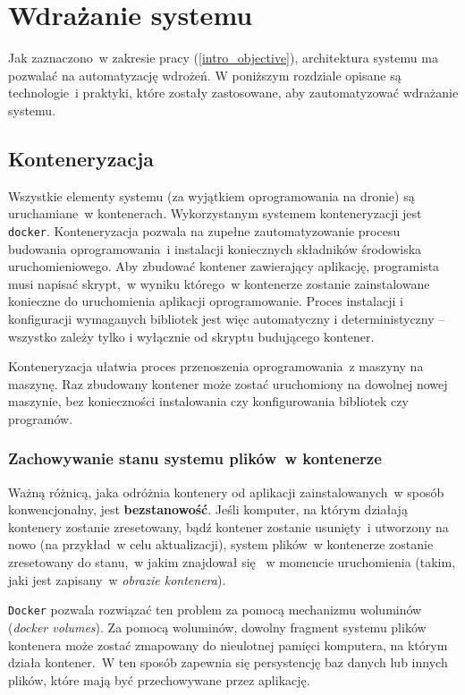 \chapter{Wdrażanie systemu} \label{chapter_deployment}

Jak zaznaczono~w zakresie pracy (\ref{intro_objective}),
architektura systemu ma pozwalać na automatyzację wdrożeń.
W poniższym rozdziale opisane są technologie~i praktyki, które zostały 
zastosowane, aby zautomatyzować wdrażanie systemu.

\section{Konteneryzacja}

Wszystkie elementy systemu (za wyjątkiem oprogramowania na dronie) są uruchamiane~w kontenerach.
Wykorzystanym systemem konteneryzacji jest \texttt{docker}\cite{docker}.
Konteneryzacja pozwala na zupełne zautomatyzowanie
procesu budowania oprogramowania~i instalacji koniecznych
składników środowiska uruchomieniowego. Aby zbudować kontener zawierający
aplikację, programista musi napisać skrypt,~w wyniku
którego~w kontenerze zostanie zainstalowane konieczne 
do uruchomienia aplikacji oprogramowanie. Proces instalacji i konfiguracji
wymaganych bibliotek jest więc automatyczny i deterministyczny -- wszystko
zależy tylko i wyłącznie od skryptu budującego kontener.

Konteneryzacja ułatwia proces przenoszenia oprogramowania~z maszyny na maszynę. Raz zbudowany
kontener może zostać uruchomiony na dowolnej nowej maszynie, bez konieczności instalowania 
czy konfigurowania bibliotek czy programów. 

\subsection{Zachowywanie stanu systemu plików~w kontenerze} \label{volumes}

Ważną różnicą, jaka odróżnia kontenery od aplikacji zainstalowanych~w sposób konwencjonalny, jest \textbf{bezstanowość}. Jeśli komputer,
na którym działają kontenery zostanie zresetowany, bądź kontener zostanie
usunięty~i utworzony na nowo (na przykład~w celu aktualizacji), system
plików~w kontenerze zostanie zresetowany do stanu,~w jakim znajdował się ~w momencie uruchomienia (takim, jaki jest zapisany~w \textit{obrazie kontenera}).

\texttt{Docker} pozwala rozwiązać ten problem za pomocą mechanizmu 
woluminów (\textit{docker volumes})\cite{docker_volumes}.
Za pomocą woluminów, dowolny fragment systemu
plików kontenera może zostać zmapowany do nieulotnej pamięci komputera, na którym 
działa kontener.~W ten sposób zapewnia się persystencję baz danych lub innych
plików, które mają być przechowywane przez aplikację.\\ %

